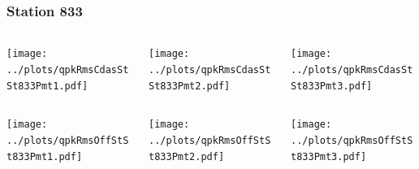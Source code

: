 \documentclass[aspectratio=169]{beamer}
\begin{document}
\begin{frame} 
  \frametitle{Station 833}
  \begin{center}
    \begin{columns}
      \begin{column}{0.33\textwidth}
        \texttt{[image: ../plots/qpkRmsCdasStSt833Pmt1.pdf]}
      \end{column}
      \begin{column}{0.33\textwidth}
        \texttt{[image: ../plots/qpkRmsCdasStSt833Pmt2.pdf]}
      \end{column}
      \begin{column}{0.33\textwidth}
        \texttt{[image: ../plots/qpkRmsCdasStSt833Pmt3.pdf]}
      \end{column}
    \end{columns}
  \end{center}

  \begin{center}
    \begin{columns}
      \begin{column}{0.33\textwidth}
        \texttt{[image: ../plots/qpkRmsOffStSt833Pmt1.pdf]}
      \end{column}
      \begin{column}{0.33\textwidth}
        \texttt{[image: ../plots/qpkRmsOffStSt833Pmt2.pdf]}
      \end{column}
      \begin{column}{0.33\textwidth}
        \texttt{[image: ../plots/qpkRmsOffStSt833Pmt3.pdf]}
      \end{column}
    \end{columns}
  \end{center}
\end{frame}
\end{document}
